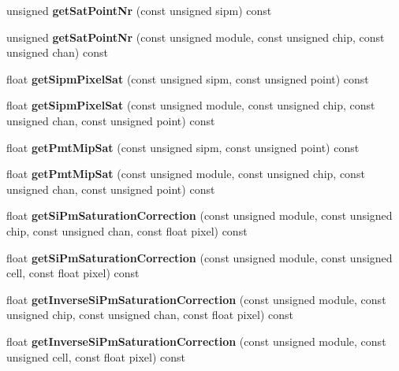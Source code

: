 \begin{DoxyCompactItemize}
\item 
unsigned {\bfseries get\-Sat\-Point\-Nr} (const unsigned sipm) const \label{classCALICE_1_1SiPmPropertiesProcessor_ad68505357900fde5b0581d213c2e0857}

\item 
unsigned {\bfseries get\-Sat\-Point\-Nr} (const unsigned module, const unsigned chip, const unsigned chan) const \label{classCALICE_1_1SiPmPropertiesProcessor_aa172924dd56f0c70743c851756e32d74}

\item 
float {\bfseries get\-Sipm\-Pixel\-Sat} (const unsigned sipm, const unsigned point) const \label{classCALICE_1_1SiPmPropertiesProcessor_a1ecb6b6213167728a638f44e2bab3e30}

\item 
float {\bfseries get\-Sipm\-Pixel\-Sat} (const unsigned module, const unsigned chip, const unsigned chan, const unsigned point) const \label{classCALICE_1_1SiPmPropertiesProcessor_a0dcb61b92932aa21ad7d7543fdb00bd8}

\item 
float {\bfseries get\-Pmt\-Mip\-Sat} (const unsigned sipm, const unsigned point) const \label{classCALICE_1_1SiPmPropertiesProcessor_abb586ffb2881f2ff95cd2db60b724de7}

\item 
float {\bfseries get\-Pmt\-Mip\-Sat} (const unsigned module, const unsigned chip, const unsigned chan, const unsigned point) const \label{classCALICE_1_1SiPmPropertiesProcessor_ae144f3314db5a24a359bd0e2f6823a37}

\item 
float {\bfseries get\-Si\-Pm\-Saturation\-Correction} (const unsigned module, const unsigned chip, const unsigned chan, const float pixel) const \label{classCALICE_1_1SiPmPropertiesProcessor_afd545661631706206e67218f3ef898eb}

\item 
float {\bfseries get\-Si\-Pm\-Saturation\-Correction} (const unsigned module, const unsigned cell, const float pixel) const \label{classCALICE_1_1SiPmPropertiesProcessor_a8358f97372e0e5d63d95393497420f7f}

\item 
float {\bfseries get\-Inverse\-Si\-Pm\-Saturation\-Correction} (const unsigned module, const unsigned chip, const unsigned chan, const float pixel) const \label{classCALICE_1_1SiPmPropertiesProcessor_a13dd5628d87e88900168bd676c2426e9}

\item 
float {\bfseries get\-Inverse\-Si\-Pm\-Saturation\-Correction} (const unsigned module, const unsigned cell, const float pixel) const \label{classCALICE_1_1SiPmPropertiesProcessor_a93644c4c6c78e16498362b7fdde0ddfa}


\end{DoxyCompactItemize}
